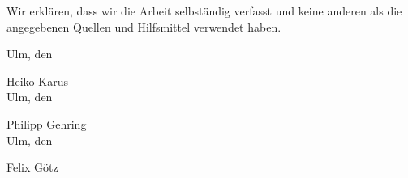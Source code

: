 \documentclass[
a4paper,
11pt,
headsepline,           %
oneside,               %
numbers=noenddot,	   %
bibliography=totoc,    %
]{scrbook}
\newcommand{\Heiko}{Heiko Karus}
\newcommand{\Philipp}{Philipp Gehring}
\newcommand{\Felix}{Felix Götz}
\begin{document}
Wir erklären, dass wir die Arbeit selbständig verfasst und keine anderen als die angegebenen Quellen und Hilfsmittel verwendet haben.\vspace{2cm}

Ulm, den \dotfill

\hspace{10cm} {\footnotesize \Heiko}\\[2em]


Ulm, den \dotfill 

\hspace{10cm} {\footnotesize \Philipp} \\[2em]


Ulm, den \dotfill

\hspace{10cm} {\footnotesize \Felix}
\end{document}
